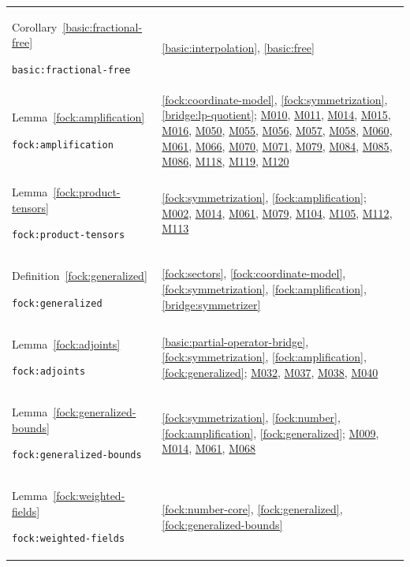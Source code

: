 \documentclass[11pt,a4paper]{article}
\theoremstyle{definition}
\theoremstyle{remark}
\begin{document}
\begin{longtable}{@{}p{}p{}@{}}
Corollary~\ref{basic:fractional-free}\par\nolinkurl{basic:fractional-free} & \ref{basic:interpolation}, \ref{basic:free} \\[4pt]
Lemma~\ref{fock:amplification}\par\nolinkurl{fock:amplification} & \ref{fock:coordinate-model}, \ref{fock:symmetrization}, \ref{bridge:lp-quotient}; \hyperref[base:M010]{M010}, \hyperref[base:M011]{M011}, \hyperref[base:M014]{M014}, \hyperref[base:M015]{M015}, \hyperref[base:M016]{M016}, \hyperref[base:M050]{M050}, \hyperref[base:M055]{M055}, \hyperref[base:M056]{M056}, \hyperref[base:M057]{M057}, \hyperref[base:M058]{M058}, \hyperref[base:M060]{M060}, \hyperref[base:M061]{M061}, \hyperref[base:M066]{M066}, \hyperref[base:M070]{M070}, \hyperref[base:M071]{M071}, \hyperref[base:M079]{M079}, \hyperref[base:M084]{M084}, \hyperref[base:M085]{M085}, \hyperref[base:M086]{M086}, \hyperref[base:M118]{M118}, \hyperref[base:M119]{M119}, \hyperref[base:M120]{M120} \\[4pt]
Lemma~\ref{fock:product-tensors}\par\nolinkurl{fock:product-tensors} & \ref{fock:symmetrization}, \ref{fock:amplification}; \hyperref[base:M002]{M002}, \hyperref[base:M014]{M014}, \hyperref[base:M061]{M061}, \hyperref[base:M079]{M079}, \hyperref[base:M104]{M104}, \hyperref[base:M105]{M105}, \hyperref[base:M112]{M112}, \hyperref[base:M113]{M113} \\[4pt]
Definition~\ref{fock:generalized}\par\nolinkurl{fock:generalized} & \ref{fock:sectors}, \ref{fock:coordinate-model}, \ref{fock:symmetrization}, \ref{fock:amplification}, \ref{bridge:symmetrizer} \\[4pt]
Lemma~\ref{fock:adjoints}\par\nolinkurl{fock:adjoints} & \ref{basic:partial-operator-bridge}, \ref{fock:symmetrization}, \ref{fock:amplification}, \ref{fock:generalized}; \hyperref[base:M032]{M032}, \hyperref[base:M037]{M037}, \hyperref[base:M038]{M038}, \hyperref[base:M040]{M040} \\[4pt]
Lemma~\ref{fock:generalized-bounds}\par\nolinkurl{fock:generalized-bounds} & \ref{fock:symmetrization}, \ref{fock:number}, \ref{fock:amplification}, \ref{fock:generalized}; \hyperref[base:M009]{M009}, \hyperref[base:M014]{M014}, \hyperref[base:M061]{M061}, \hyperref[base:M068]{M068} \\[4pt]
Lemma~\ref{fock:weighted-fields}\par\nolinkurl{fock:weighted-fields} & \ref{fock:number-core}, \ref{fock:generalized}, \ref{fock:generalized-bounds} \\[4pt]

\end{longtable}
\end{document}
